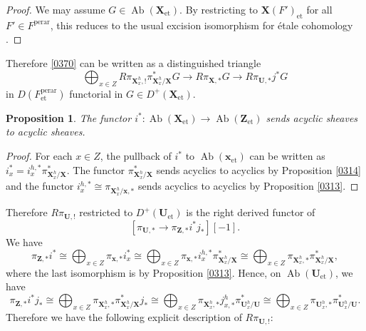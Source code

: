 \documentclass{amsart}
\newtheorem{Prop}[Thm]{Proposition}
\theoremstyle{remark}
\numberwithin{equation}{subsection}
\newcommand{\et}{\mathrm{et}}
\newcommand{\perar}{\mathrm{perar}}
\newcommand{\alg}[1]{\mathbf{#1}}
\DeclareMathOperator{\Ab}{Ab}
\begin{document}
\begin{proof}
	We may assume $G \in \Ab(\alg{X}_{\et})$.
	By restricting to $\alg{X}(F')_{\et}$ for all $F' \in F^{\perar}$,
	this reduces to the usual excision isomorphism for \'etale cohomology
	\cite[Chapter III, Corollary 1.28]{Mil80}.
\end{proof}

Therefore \eqref{0370} can be written as a distinguished triangle
	\[
			\bigoplus_{x \in Z}
				R \pi_{\alg{X}_{x}^{h}, !}
				\pi_{\alg{X}_{x}^{h} / \alg{X}}^{\ast} G
		\to
				R \pi_{\alg{X}, \ast} G
			\to
				R \pi_{\alg{U}, \ast} j^{\ast} G
	\]
in $D(F^{\perar}_{\et})$ functorial in $G \in D^{+}(\alg{X}_{\et})$.

\begin{Prop}
	The functor $i^{\ast} \colon \Ab(\alg{X}_{\et}) \to \Ab(\alg{Z}_{\et})$
	sends acyclic sheaves to acyclic sheaves.
\end{Prop}

\begin{proof}
	For each $x \in Z$, the pullback of $i^{\ast}$ to $\Ab(\alg{x}_{\et})$ can be written as
	$i_{x}^{\ast} = i_{x}^{h, \ast} \pi_{\alg{X}_{x}^{h} / \alg{X}}^{\ast}$.
	The functor $\pi_{\alg{X}_{x}^{h} / \alg{X}}^{\ast}$ sends acyclics to acyclics
	by Proposition \ref{0314}
	and the functor $i_{x}^{h, \ast} \cong \pi_{\alg{X}_{x}^{h} / \alg{x}, \ast}$ sends acyclics to acyclics
	by Proposition \ref{0313}.
\end{proof}

Therefore $R \pi_{\alg{U}, !}$ restricted to $D^{+}(\alg{U}_{\et})$ is the right derived functor of
	\[
		[
				\pi_{\alg{U}, \ast}
			\to
				\pi_{\alg{Z}, \ast} i^{\ast} j_{\ast}
		][-1].
	\]
We have
	\[
			\pi_{\alg{Z}, \ast} i^{\ast}
		\cong
			\bigoplus_{x \in Z}
				\pi_{\alg{x}, \ast}
				i_{x}^{\ast}
		\cong
			\bigoplus_{x \in Z}
				\pi_{\alg{x}, \ast}
				i_{x}^{h, \ast}
				\pi_{\alg{X}_{x}^{h} / \alg{X}}^{\ast}
		\cong
			\bigoplus_{x \in Z}
				\pi_{\alg{X}_{x}^{h}, \ast}
				\pi_{\alg{X}_{x}^{h} / \alg{X}}^{\ast},
	\]
where the last isomorphism is by Proposition \ref{0313}.
Hence, on $\Ab(\alg{U}_{\et})$, we have
	\[
			\pi_{\alg{Z}, \ast} i^{\ast} j_{\ast}
		\cong
			\bigoplus_{x \in Z}
				\pi_{\alg{X}_{x}^{h}, \ast}
				\pi_{\alg{X}_{x}^{h} / \alg{X}}^{\ast}
				j_{\ast}
		\cong
			\bigoplus_{x \in Z}
				\pi_{\alg{X}_{x}^{h}, \ast}
				j_{x, \ast}^{h}
				\pi_{\alg{U}_{x}^{h} / \alg{U}}^{\ast}
		\cong
			\bigoplus_{x \in Z}
				\pi_{\alg{U}_{x}^{h}, \ast}
				\pi_{\alg{U}_{x}^{h} / \alg{U}}^{\ast}.
	\]
Therefore we have the following explicit description
of $R \pi_{\alg{U}, !}$:
\end{document}
